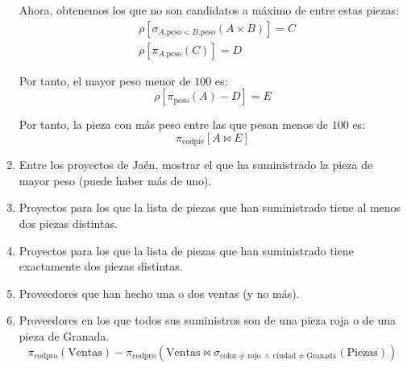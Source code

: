 \begin{ejercicio}
\begin{enumerate}
        Ahora, obtenemos los que no son candidatos a máximo de entre estas piezas:
        \begin{align*}
            &\rho\left[\sigma_{A.\text{peso}<B.\text{peso}}(A\times B)\right]=C\\
            &\rho\left[\pi_{A.\text{peso}}(C)\right]=D
        \end{align*}

        Por tanto, el mayor peso menor de $100$ es:
        \begin{equation*}
            \rho\left[\pi_{\text{peso}}(A)-D\right]=E
        \end{equation*}

        Por tanto, la pieza con más peso entre las que pesan menos de $100$ es:
        \begin{equation*}
            \pi_{\text{codpie}}\left[A\bowtie E\right]
        \end{equation*}
        \item Entre los proyectos de Jaén, mostrar el que ha suministrado la pieza de mayor peso (puede haber más de uno).
        

        \item Proyectos para los que la lista de piezas que han suministrado tiene al menos dos piezas distintas.
        
        \item Proyectos para los que la lista de piezas que han suministrado tiene exactamente dos piezas distintas.
        
        \item Proveedores que han hecho una o dos ventas (y no más).
        
        \item Proveedores en los que todos sus suministros son de una pieza roja o de una pieza de Granada.
        \begin{equation*}
            \pi_{\text{codpro}}(\text{Ventas}) - \pi_{\text{codpro}}(\text{Ventas} \bowtie \sigma_{\text{color}\neq \text{rojo} ~\land~ \text{ciudad}\neq \text{Granada}}(\text{Piezas}))
        \end{equation*}
    \end{enumerate}
    
\end{ejercicio}
